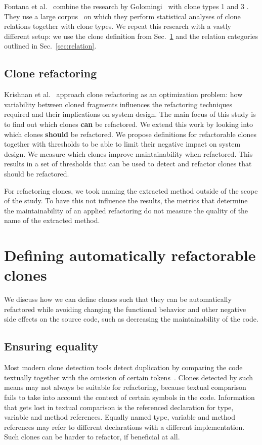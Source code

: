 \documentclass[sigconf,review,anonymous]{acmart}
\begin{document}
Fontana et al.~\cite{fontana2012duplicated, fontana2015duplicated} combine the research by Golomingi~\cite{koni2001scenario} with clone types 1 and 3 \cite{roy2007survey}. They use a large corpus~\cite{tempero2010qualitas} on which they perform statistical analyses of clone relations together with clone types. We repeat this research with a vastly different setup: we use the clone definition from Sec.~\ref{sec:research} and the relation categories outlined in Sec.~\ref{sec:relation}.

\subsection{Clone refactoring}
Krishnan et al.~\cite{krishnan2013refactoring} approach clone refactoring as an optimization problem: how variability between cloned fragments influences the refactoring techniques required and their implications on system design. The main focus of this study is to find out which clones \textbf{can} be refactored. We extend this work by looking into which clones \textbf{should} be refactored. We propose definitions for refactorable clones together with thresholds to be able to limit their negative impact on system design. We measure which clones improve maintainability when refactored. This results in a set of thresholds that can be used to detect and refactor clones that should be refactored.

For refactoring clones, we took naming the extracted method outside of the scope of the study. To have this not influence the results, the metrics that determine the maintainability of an applied refactoring do not measure the quality of the name of the extracted method. 

\section{Defining automatically refactorable clones}\label{sec:research}
We discuss how we can define clones such that they can be automatically refactored while avoiding changing the functional behavior and other negative side effects on the source code, such as decreasing the maintainability of the code.

\subsection{Ensuring equality}\label{sec:t1r}
Most modern clone detection tools detect duplication by comparing the code textually together with the omission of certain tokens~\cite{roy2009comparison, svajlenko2014evaluating}. Clones detected by such means may not always be suitable for refactoring, because textual comparison fails to take into account the context of certain symbols in the code. Information that gets lost in textual comparison is the referenced declaration for type, variable and method references. Equally named type, variable and method references may refer to different declarations with a different implementation. Such clones can be harder to refactor, if beneficial at all.
\end{document}

